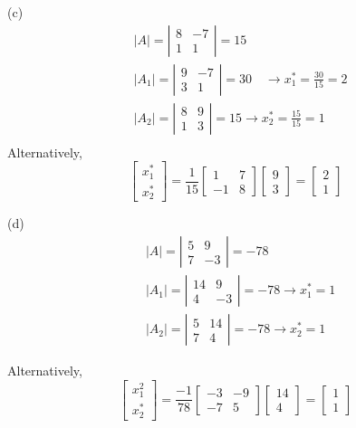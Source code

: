 \documentclass{./../../Latex/homework}
\begin{document}
\begin{enumerate}
(c)
$$
\begin{aligned}
& |A|=\left|\begin{array}{cc}
8 & -7 \\
1 & 1
\end{array}\right|=15 \\
& \left|A_{1}\right|=\left|\begin{array}{cc}
9 & -7 \\
3 & 1
\end{array}\right|=30 \quad \rightarrow x_{1}^{*}=\frac{30}{15}=2 \\
& \left|A_{2}\right|=\left|\begin{array}{cc}
8 & 9 \\
1 & 3
\end{array}\right|=15 \rightarrow x_{2}^{*}=\frac{15}{15}=1 \\
\end{aligned}
$$
Alternatively, 
$$\left[\begin{array}{c}
x_{1}^{*} \\
x_{2}^{*}
\end{array}\right]=\frac{1}{15}\left[\begin{array}{cc}
1 & 7 \\
-1 & 8
\end{array}\right]\left[\begin{array}{l}
9 \\
3
\end{array}\right]=\left[\begin{array}{l}
2 \\
1
\end{array}\right]
$$

(d)
$$
\begin{aligned}
& |A|=\left|\begin{array}{cc}
5 & 9 \\
7 & -3
\end{array}\right|=-78 \\
& \left|A_{1}\right|=\left|\begin{array}{cc}
14 & 9 \\
4 & -3
\end{array}\right|=-78 \rightarrow x_{1}^{*}=1 \\
& \left|A_{2}\right|=\left|\begin{array}{cc}
5 & 14 \\
7 & 4
\end{array}\right|=-78 \rightarrow x_{2}^{*}=1
\end{aligned}
$$

Alternatively, $$\left[\begin{array}{l}x_{1}^{2} \\ x_{2}^{*}\end{array}\right]=\frac{-1}{78}\left[\begin{array}{cc}-3 & -9 \\ -7 & 5\end{array}\right]\left[\begin{array}{c}14 \\ 4\end{array}\right]=\left[\begin{array}{l}1 \\ 1\end{array}\right]$$


\end{enumerate}
\end{document}
